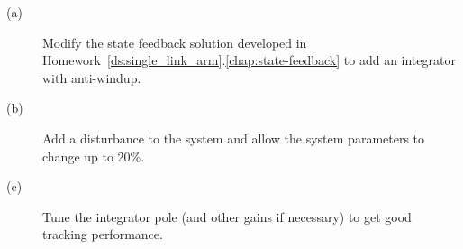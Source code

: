 
\begin{description}\item[]
\item[(a)] Modify the state feedback solution developed in Homework~\ref{ds:single_link_arm}.\ref{chap:state-feedback} to add an integrator with anti-windup.
\item[(b)] Add a disturbance to the system and allow the system parameters to change up to 20\%.
\item[(c)] Tune the integrator pole (and other gains if necessary) to get good tracking performance.
\end{description}
